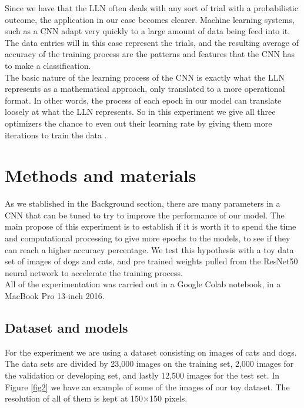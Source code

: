 \documentclass[review]{elsarticle}
\begin{document}
Since we have that the LLN often deals with any sort of trial with a probabilistic outcome, the application in our case becomes clearer. Machine learning systems, such as a CNN adapt very quickly to a large amount of data being feed into it. The data entries will in this case represent the trials, and the resulting average of accuracy of the training process are the patterns and features that the CNN has to make a classification. \\

The basic nature of the learning process of the CNN is exactly what the LLN represents as a mathematical approach, only translated to a more operational format. In other words, the process of each epoch in our model can translate loosely at what the LLN represents. So in this experiment we give all three optimizers the chance to even out their learning rate by giving them more iterations to train the data \cite{sirignano}.\\


\section{Methods and materials}\label{method}

As we stablished in the Background section, there are many parameters in a CNN that can be tuned to try to improve the performance of our model. The main propose of this experiment is to establish if it is worth it to spend the time and computational processing to give more epochs to the models, to see if they can reach a higher accuracy percentage. We test this hypothesis  with a toy data set of images of dogs and cats, and pre trained weights pulled from the ResNet50 neural network to accelerate the training process.\\

All of the experimentation was carried out in a Google Colab notebook, in a MacBook Pro 13-inch 2016.\\

\subsection{Dataset and models}

For the experiment we are using a dataset consisting on images of cats and dogs. The data sets are divided by 23,000 images on the training set, 2,000 images for the validation or developing set, and lastly 12,500 images for the test set. In Figure \ref{fig2} we have an example of some of the images of our toy dataset. The resolution of all of them is kept at 150$\times$150 pixels.
\end{document}
